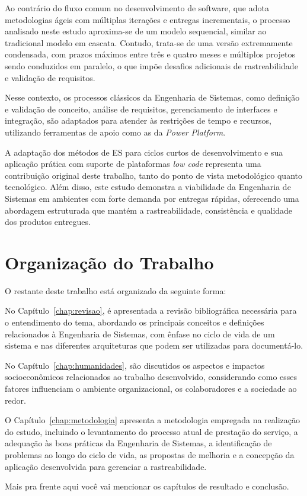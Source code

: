 	Ao contrário do fluxo comum no desenvolvimento de software, que adota metodologias ágeis com múltiplas iterações e entregas incrementais,
	o processo analisado neste estudo aproxima-se de um modelo sequencial, similar ao tradicional modelo em cascata. Contudo, trata-se de uma versão extremamente
	condensada, com prazos máximos entre três e quatro meses e múltiplos projetos sendo conduzidos em paralelo, o que impõe desafios adicionais de rastreabilidade
	e validação de requisitos.

	Nesse contexto, os processos clássicos da Engenharia de Sistemas, como definição e validação de conceito, análise de requisitos, gerenciamento de interfaces
	e integração, são adaptados para atender às restrições de tempo e recursos, utilizando ferramentas de apoio como as da \textit{Power Platform}.

	A adaptação dos métodos de ES para ciclos curtos de desenvolvimento e sua aplicação prática com suporte de plataformas \textit{low code} representa uma contribuição
	original deste trabalho, tanto do ponto de vista metodológico quanto tecnológico. Além disso, este estudo demonstra a viabilidade da Engenharia de Sistemas em
	ambientes com forte demanda por entregas rápidas, oferecendo uma abordagem estruturada que mantém a rastreabilidade, consistência e qualidade dos produtos entregues.

		
	\section{Organização do Trabalho}\label{sec:introducao:organizacao}

		O restante deste trabalho está organizado da seguinte forma:

		No Capítulo~\ref{chap:revisao}, é apresentada a revisão bibliográfica necessária para o entendimento do tema, abordando os principais conceitos e
		definições relacionados à Engenharia de Sistemas, com ênfase no ciclo de vida de um sistema e nas diferentes arquiteturas que podem ser utilizadas para documentá-lo.

		No Capítulo~\ref{chap:humanidades}, são discutidos os aspectos e impactos socioeconômicos relacionados ao trabalho desenvolvido, considerando como esses fatores
		influenciam o ambiente organizacional, os colaboradores e a sociedade ao redor.

		O Capítulo~\ref{chap:metodologia} apresenta a metodologia empregada na realização do estudo, incluindo o levantamento do processo atual de prestação do serviço,
		a adequação às boas práticas da Engenharia de Sistemas, a identificação de problemas ao longo do ciclo de vida, as propostas de melhoria e a concepção da aplicação
		desenvolvida para gerenciar a rastreabilidade.

		
		{\color{red} Mais pra frente aqui você vai mencionar os capítulos de resultado e conclusão.}
		
